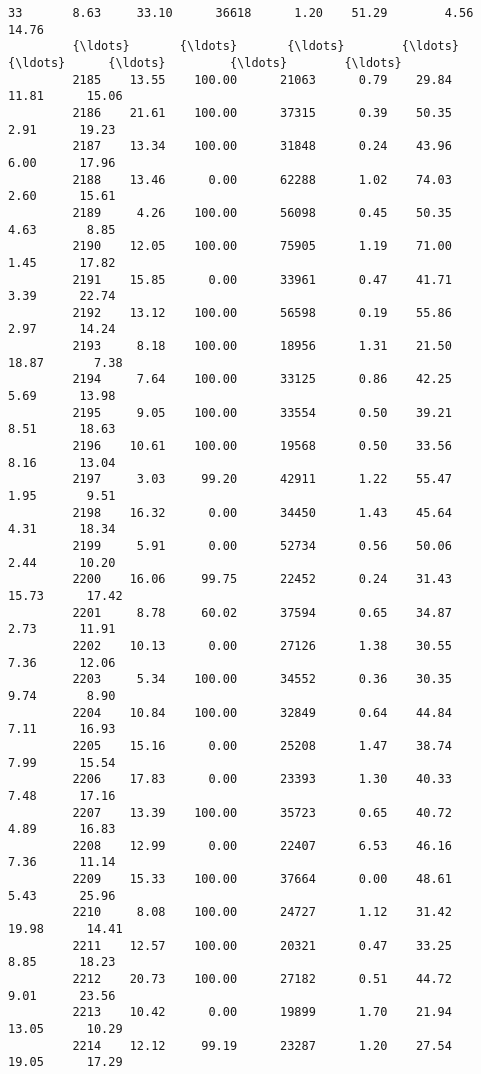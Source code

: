 \documentclass[11pt]{llncs}
\begin{document}
\begin{Verbatim}[commandchars=\\\{\}]
         33       8.63     33.10      36618      1.20    51.29        4.56      14.76   
         {\ldots}       {\ldots}       {\ldots}        {\ldots}       {\ldots}      {\ldots}         {\ldots}        {\ldots}   
         2185    13.55    100.00      21063      0.79    29.84       11.81      15.06   
         2186    21.61    100.00      37315      0.39    50.35        2.91      19.23   
         2187    13.34    100.00      31848      0.24    43.96        6.00      17.96   
         2188    13.46      0.00      62288      1.02    74.03        2.60      15.61   
         2189     4.26    100.00      56098      0.45    50.35        4.63       8.85   
         2190    12.05    100.00      75905      1.19    71.00        1.45      17.82   
         2191    15.85      0.00      33961      0.47    41.71        3.39      22.74   
         2192    13.12    100.00      56598      0.19    55.86        2.97      14.24   
         2193     8.18    100.00      18956      1.31    21.50       18.87       7.38   
         2194     7.64    100.00      33125      0.86    42.25        5.69      13.98   
         2195     9.05    100.00      33554      0.50    39.21        8.51      18.63   
         2196    10.61    100.00      19568      0.50    33.56        8.16      13.04   
         2197     3.03     99.20      42911      1.22    55.47        1.95       9.51   
         2198    16.32      0.00      34450      1.43    45.64        4.31      18.34   
         2199     5.91      0.00      52734      0.56    50.06        2.44      10.20   
         2200    16.06     99.75      22452      0.24    31.43       15.73      17.42   
         2201     8.78     60.02      37594      0.65    34.87        2.73      11.91   
         2202    10.13      0.00      27126      1.38    30.55        7.36      12.06   
         2203     5.34    100.00      34552      0.36    30.35        9.74       8.90   
         2204    10.84    100.00      32849      0.64    44.84        7.11      16.93   
         2205    15.16      0.00      25208      1.47    38.74        7.99      15.54   
         2206    17.83      0.00      23393      1.30    40.33        7.48      17.16   
         2207    13.39    100.00      35723      0.65    40.72        4.89      16.83   
         2208    12.99      0.00      22407      6.53    46.16        7.36      11.14   
         2209    15.33    100.00      37664      0.00    48.61        5.43      25.96   
         2210     8.08    100.00      24727      1.12    31.42       19.98      14.41   
         2211    12.57    100.00      20321      0.47    33.25        8.85      18.23   
         2212    20.73    100.00      27182      0.51    44.72        9.01      23.56   
         2213    10.42      0.00      19899      1.70    21.94       13.05      10.29   
         2214    12.12     99.19      23287      1.20    27.54       19.05      17.29   
         

\end{Verbatim}
\end{document}
